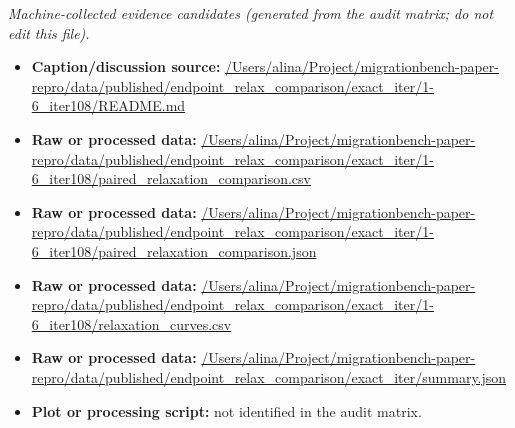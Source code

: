 \emph{Machine-collected evidence candidates (generated from the audit matrix; do not edit this file).}
\begin{itemize}[leftmargin=1.4em,noitemsep]
\item \textbf{Caption/discussion source:} \url{/Users/alina/Project/migrationbench-paper-repro/data/published/endpoint_relax_comparison/exact_iter/1-6_iter108/README.md}
\item \textbf{Raw or processed data:} \url{/Users/alina/Project/migrationbench-paper-repro/data/published/endpoint_relax_comparison/exact_iter/1-6_iter108/paired_relaxation_comparison.csv}
\item \textbf{Raw or processed data:} \url{/Users/alina/Project/migrationbench-paper-repro/data/published/endpoint_relax_comparison/exact_iter/1-6_iter108/paired_relaxation_comparison.json}
\item \textbf{Raw or processed data:} \url{/Users/alina/Project/migrationbench-paper-repro/data/published/endpoint_relax_comparison/exact_iter/1-6_iter108/relaxation_curves.csv}
\item \textbf{Raw or processed data:} \url{/Users/alina/Project/migrationbench-paper-repro/data/published/endpoint_relax_comparison/exact_iter/summary.json}
\item \textbf{Plot or processing script:} not identified in the audit matrix.
\end{itemize}
